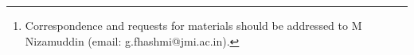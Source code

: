 \author{Faraz Hashmi$^{1}$ \& M Nizamuddin$^{1}$\thanks{Correspondence and requests for materials should be addressed to M Nizamuddin (email: g.fhashmi@jmi.ac.in).}}
